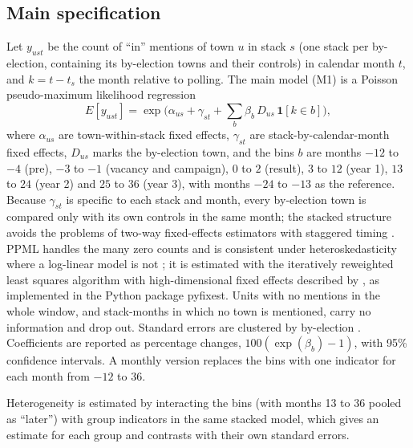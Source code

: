 \documentclass[11pt,a4paper]{article}
\begin{document}
\subsection{Main specification}
Let $y_{ust}$ be the count of ``in'' mentions of town $u$ in stack $s$ (one stack per by-election, containing its by-election towns and their controls) in calendar month $t$, and $k = t - t_s$ the month relative to polling. The main model (M1) is a Poisson pseudo-maximum likelihood regression
\begin{equation}
E[y_{ust}] = \exp\Big(\alpha_{us} + \gamma_{st} + \sum_{b} \beta_b \, D_{us} \, \mathbf{1}[k \in b]\Big),
\end{equation}
where $\alpha_{us}$ are town-within-stack fixed effects, $\gamma_{st}$ are stack-by-calendar-month fixed effects, $D_{us}$ marks the by-election town, and the bins $b$ are months $-12$ to $-4$ (pre), $-3$ to $-1$ (vacancy and campaign), $0$ to $2$ (result), $3$ to $12$ (year 1), $13$ to $24$ (year 2) and $25$ to $36$ (year 3), with months $-24$ to $-13$ as the reference. Because $\gamma_{st}$ is specific to each stack and month, every by-election town is compared only with its own controls in the same month; the stacked structure avoids the problems of two-way fixed-effects estimators with staggered timing \citep{baker2022,sun2021,cengiz2019}. PPML handles the many zero counts and is consistent under heteroskedasticity where a log-linear model is not \citep{santos2006}; it is estimated with the iteratively reweighted least squares algorithm with high-dimensional fixed effects described by \citet{correia2020}, as implemented in the Python package pyfixest. Units with no mentions in the whole window, and stack-months in which no town is mentioned, carry no information and drop out. Standard errors are clustered by by-election \citep{cameron2015,abadie2023}. Coefficients are reported as percentage changes, $100(\exp(\beta_b)-1)$, with 95\% confidence intervals. A monthly version replaces the bins with one indicator for each month from $-12$ to $36$.

Heterogeneity is estimated by interacting the bins (with months 13 to 36 pooled as ``later'') with group indicators in the same stacked model, which gives an estimate for each group and contrasts with their own standard errors.
\end{document}
